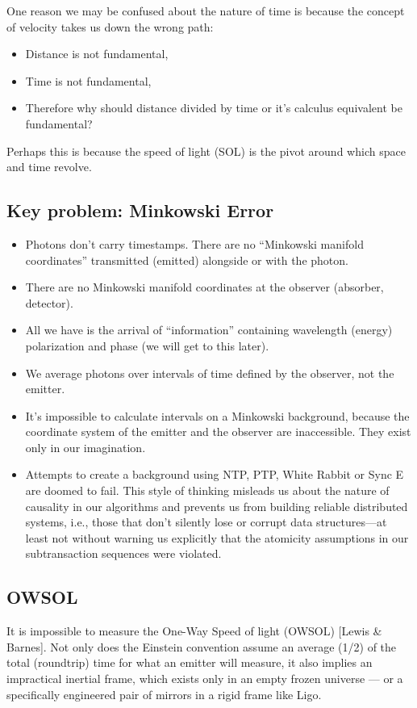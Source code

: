 \documentclass[../../../OAE-SPEC-MAIN.tex]{subfiles}
\begin{document}
One reason we may be confused about the nature of time is because the concept of velocity takes us down the wrong path:
\vspace{5px}
\begin{itemize}
  \item Distance is not fundamental,
  \item Time is not fundamental,
  \item Therefore why should distance divided by time or it’s calculus equivalent  be fundamental?
\end{itemize}
Perhaps this is because the speed of light (SOL) is the pivot around which space and time revolve.


\subsection{Key problem: Minkowski Error}
\begin{itemize}
  \item Photons don’t carry timestamps. There are no “Minkowski manifold coordinates” transmitted (emitted) alongside or with the photon.
  \item There are no Minkowski manifold coordinates at the observer (absorber, detector).
  \item All we have is the arrival of “information” containing wavelength (energy) polarization and phase (we will get to this later). 
  \item We average photons over intervals of time defined by the observer, not the emitter. 
  \item It’s impossible to calculate intervals on a Minkowski background, because the coordinate system of the emitter and the observer are inaccessible. They exist only in our imagination.
  \item Attempts to create a background using NTP, PTP, White Rabbit or Sync E are doomed to fail. This style of thinking misleads us about the nature of causality in our algorithms and prevents us from building reliable distributed systems, i.e., those that don’t silently lose or corrupt data structures—at least not without warning us explicitly that the atomicity assumptions in our subtransaction sequences were violated. 
\end{itemize}


\subsection{OWSOL}
It is impossible to measure the One-Way Speed of light (OWSOL) [Lewis \& Barnes]. Not only does the Einstein convention assume an average (1/2) of the total (roundtrip) time for what an emitter will measure, it also implies an impractical inertial frame, which exists only in an empty frozen universe — or a specifically engineered pair of mirrors in a rigid frame like Ligo.
\end{document}
